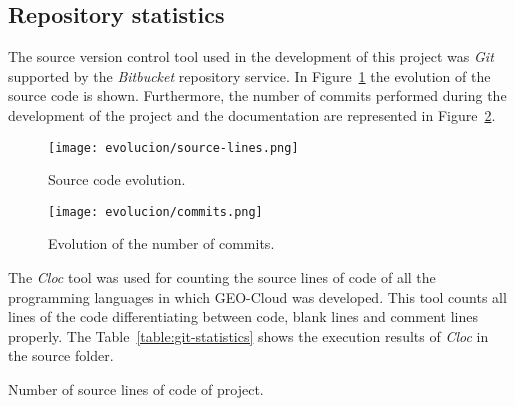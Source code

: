 \subsection{Repository statistics}

The source version control tool used in the development of this project was \emph{Git}
supported by the \emph{Bitbucket} repository service. In Figure~\ref{fig:source-lines} the
evolution of the source code is shown. Furthermore, the number of commits
performed during the development of the project and the documentation are
represented in Figure~\ref{fig:commits}.

\begin{figure}[!h]
\begin{center}
\texttt{[image: evolucion/source-lines.png]}
\caption{Source code evolution.}
\label{fig:source-lines}
\end{center}
\end{figure}

\begin{figure}[ht]
\begin{center}
\texttt{[image: evolucion/commits.png]}
\caption{Evolution of the number of commits.}
\label{fig:commits}
\end{center}
\end{figure}

The \emph{Cloc} tool was used for counting the source lines of code of all the
programming languages in which
GEO-Cloud was developed. This tool counts all lines of the code differentiating
between code, blank lines and comment lines properly. The Table~\ref{table:git-statistics} shows the
execution results of \emph{Cloc} in the source folder.

\begin{table}[ht]
  \centering
  {\small
  
  }
  \caption{Number of source lines of code of project.}
  \label{table:git-statistics}
\end{table}

